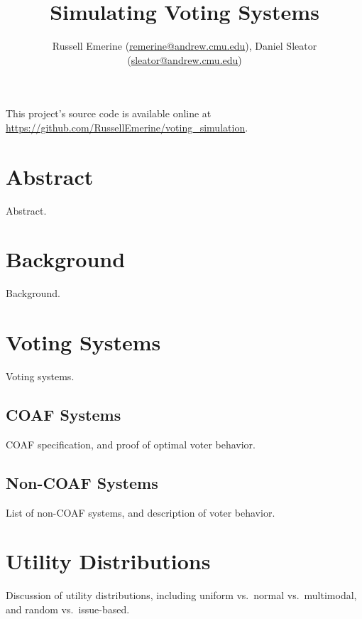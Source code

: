 \documentclass[12pt]{article}
\begin{document}
    \setlength{\parindent}{0pt}
    \setlength{\parskip}{5pt}
    \setlength{\headheight}{14.49999pt}
    \addtolength{\topmargin}{-1.59999pt}

    \title{Simulating Voting Systems}
    \author{\normalsize{Russell Emerine (\url{remerine@andrew.cmu.edu}), Daniel Sleator (\url{sleator@andrew.cmu.edu})}}
    \date{}

    \maketitle

    This project's source code is available online at \url{https://github.com/RussellEmerine/voting_simulation}.


    \section{Abstract}\label{sec:abstract}

    Abstract.


    \section{Background}

    Background.


    \section{Voting Systems}

    Voting systems.

    \subsection{COAF Systems}

    COAF specification, and proof of optimal voter behavior.

    \subsection{Non-COAF Systems}

    List of non-COAF systems, and description of voter behavior.


    \section{Utility Distributions}

    Discussion of utility distributions, including uniform vs.\ normal
    vs.\ multimodal, and random vs.\ issue-based.
\end{document}
